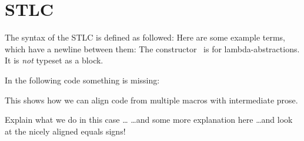 \documentclass{article}
\begin{document}
  \section{STLC}
  The syntax of the STLC is defined as followed:
  \STLCSyntax
  Here are some example terms, which have a newline between them:
  \STLCExamples
  The constructor \STLCEAbs\ is for lambda-abstractions. It is \emph{not} typeset as a block.

  In the following code something is missing:
  \STLCHideExample

  This shows how we can align code from multiple macros with intermediate
  prose.
  \begin{AgdaAlign}
    \STLCSizeI*
    Explain what we do in this case \dots
    \STLCSizeII*
    \dots and some more explanation here
    \STLCSizeIII*
    \dots and look at the nicely aligned equals signs!
  \end{AgdaAlign}
\end{document}
